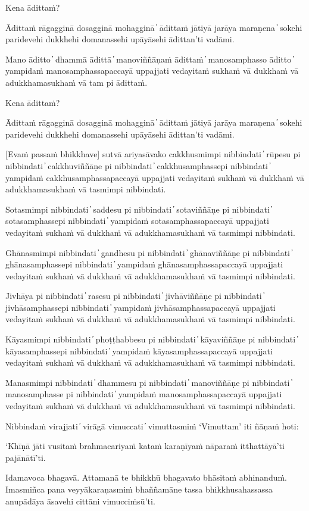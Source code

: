 Kena ādittaṁ?

Ādittaṁ rāgagginā dosagginā mohagginā  ̓  ādittaṁ jātiyā jarāya maraṇena  ̓  sokehi paridevehi dukkhehi domanassehi upāyāsehi ādittan’ti vadāmi.

Mano āditto  ̓  dhammā ādittā  ̓  manoviññāṇaṁ ādittaṁ  ̓  manosamphasso āditto  ̓  yampidaṁ manosamphassapaccayā uppajjati vedayitaṁ sukhaṁ vā dukkhaṁ vā adukkhamasukhaṁ vā tam pi ādittaṁ.

Kena ādittaṁ?

Ādittaṁ rāgagginā dosagginā mohagginā  ̓  ādittaṁ jātiyā jarāya maraṇena  ̓  sokehi paridevehi dukkhehi domanassehi upāyāsehi ādittan’ti vadāmi.

[Evaṁ passaṁ bhikkhave] sutvā ariyasāvako cakkhusmimpi nibbindati  ̓  rūpesu pi nibbindati  ̓  cakkhuviññāṇe pi nibbindati  ̓  cakkhusamphassepi nibbindati  ̓  yampidaṁ cakkhusamphassapaccayā uppajjati vedayitaṁ sukhaṁ vā dukkhaṁ vā adukkhamasukhaṁ vā tasmimpi nibbindati.

Sotasmimpi nibbindati  ̓  saddesu pi nibbindati  ̓  sotaviññāṇe pi nibbindati  ̓  sotasamphassepi nibbindati  ̓  yampidaṁ sotasamphassapaccayā uppajjati vedayitaṁ sukhaṁ vā dukkhaṁ vā adukkhamasukhaṁ vā tasmimpi nibbindati.

Ghānasmimpi nibbindati  ̓  gandhesu pi nibbindati  ̓  ghānaviññāṇe pi nibbindati  ̓  ghānasamphassepi nibbindati  ̓  yampidaṁ ghānasamphassapaccayā uppajjati vedayitaṁ sukhaṁ vā dukkhaṁ vā adukkhamasukhaṁ vā tasmimpi nibbindati.

Jivhāya pi nibbindati  ̓  rasesu pi nibbindati  ̓  jivhāviññāṇe pi nibbindati  ̓  jivhāsamphassepi nibbindati  ̓  yampidaṁ jivhāsamphassapaccayā uppajjati vedayitaṁ sukhaṁ vā dukkhaṁ vā adukkhamasukhaṁ vā tasmimpi nibbindati.

Kāyasmimpi nibbindati  ̓  phoṭṭhabbesu pi nibbindati  ̓  kāyaviññāṇe pi nibbindati  ̓  kāyasamphassepi nibbindati  ̓  yampidaṁ kāyasamphassapaccayā uppajjati vedayitaṁ sukhaṁ vā dukkhaṁ vā adukkhamasukhaṁ vā tasmimpi nibbindati.

Manasmimpi nibbindati  ̓  dhammesu pi nibbindati  ̓  manoviññāṇe pi nibbindati  ̓  manosamphasse pi nibbindati  ̓  yampidaṁ manosamphassapaccayā uppajjati vedayitaṁ sukhaṁ vā dukkhaṁ vā adukkhamasukhaṁ vā tasmimpi nibbindati.

Nibbindaṁ virajjati  ̓  virāgā vimuccati  ̓  vimuttasmiṁ ‘Vimuttam’ iti ñāṇaṁ hoti:

‘Khīṇā jāti vusitaṁ brahmacariyaṁ kataṁ karaṇīyaṁ nāparaṁ itthattāyā’ti pajānātī’ti.

Idamavoca bhagavā. Attamanā te bhikkhū bhagavato bhāsitaṁ abhinanduṁ. Imasmiñca pana veyyākaraṇasmiṁ bhaññamāne tassa bhikkhusahassassa anupādāya āsavehi cittāni vimucciṁsū’ti.

